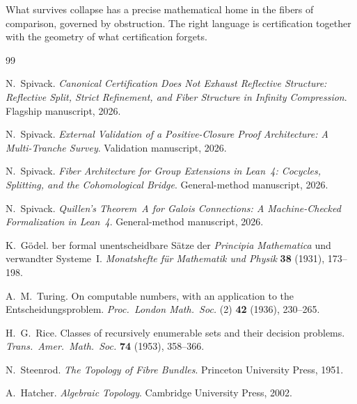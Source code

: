 \documentclass[11pt]{article}
\begin{document}
What survives collapse has a precise mathematical home in the fibers of comparison,
governed by obstruction. The right language is certification together with the geometry of what
certification forgets.


\begin{thebibliography}{99}

N.~Spivack.
\newblock \emph{Canonical Certification Does Not Exhaust Reflective Structure:
  Reflective Split, Strict Refinement, and Fiber Structure in Infinity Compression}.
\newblock Flagship manuscript, 2026.

N.~Spivack.
\newblock \emph{External Validation of a Positive-Closure Proof Architecture:
  A Multi-Tranche Survey}.
\newblock Validation manuscript, 2026.

N.~Spivack.
\newblock \emph{Fiber Architecture for Group Extensions in Lean~4: Cocycles, Splitting,
  and the Cohomological Bridge}.
\newblock General-method manuscript, 2026.

N.~Spivack.
\newblock \emph{Quillen's Theorem~A for Galois Connections: A Machine-Checked
  Formalization in Lean~4}.
\newblock General-method manuscript, 2026.

K.~G\"odel.
ber formal unentscheidbare S{\"a}tze der \emph{Principia Mathematica} und
  verwandter Systeme~I.
\newblock \emph{Monatshefte f\"ur Mathematik und Physik} \textbf{38} (1931), 173--198.

A.~M.~Turing.
\newblock On computable numbers, with an application to the Entscheidungsproblem.
\newblock \emph{Proc.\ London Math.\ Soc.} (2) \textbf{42} (1936), 230--265.

H.~G.~Rice.
\newblock Classes of recursively enumerable sets and their decision problems.
\newblock \emph{Trans.\ Amer.\ Math.\ Soc.} \textbf{74} (1953), 358--366.

N.~Steenrod.
\newblock \emph{The Topology of Fibre Bundles}.
\newblock Princeton University Press, 1951.

A.~Hatcher.
\newblock \emph{Algebraic Topology}.
\newblock Cambridge University Press, 2002.

\end{thebibliography}
\end{document}
